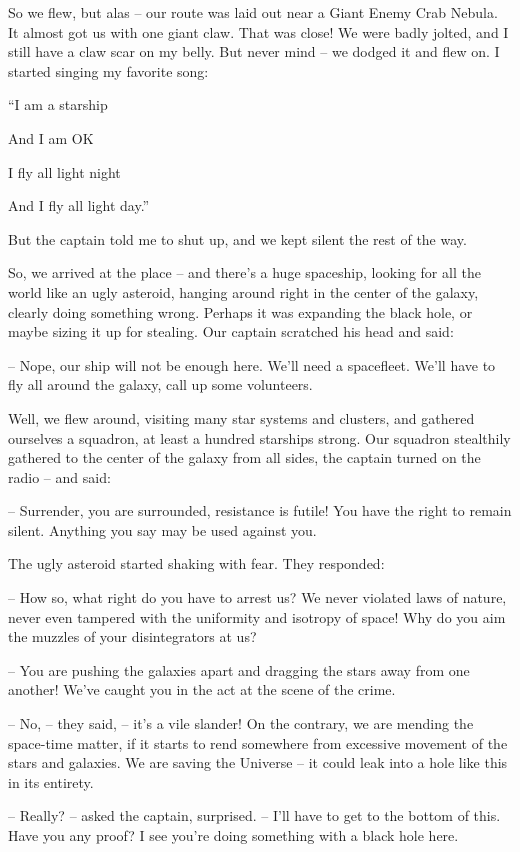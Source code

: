 \documentclass[ebook,oneside,final,openright]{memoir}
\begin{document}
So we flew, but alas – our route was laid out near a Giant Enemy Crab Nebula. It almost got us with one giant claw. That was close! We were badly jolted, and I still have a claw scar on my belly. But never mind – we dodged it and flew on. I started singing my favorite song: \par
“I am a starship \par
 And I am OK \par
 I fly all light night \par
 And I fly all light day.”\par
 But the captain told me to shut up, and we kept silent the rest of the way.\par
\par
So, we arrived at the place – and there’s a huge spaceship, looking for all the world like an ugly asteroid, hanging around right in the center of the galaxy, clearly doing something wrong. Perhaps it was expanding the black hole, or maybe sizing it up for stealing. Our captain scratched his head and said:\par
– Nope, our ship will not be enough here. We’ll need a spacefleet. We’ll have to fly all around the galaxy, call up some volunteers.\par
Well, we flew around, visiting many star systems and clusters, and gathered ourselves a squadron, at least a hundred starships strong. Our squadron stealthily gathered to the center of the galaxy from all sides, the captain turned on the radio – and said:\par
– Surrender, you are surrounded, resistance is futile! You have the right to remain silent. Anything you say may be used against you.\par
The ugly asteroid started shaking with fear. They responded:\par
– How so, what right do you have to arrest us? We never violated laws of nature, never even tampered with the uniformity and isotropy of space! Why do you aim the muzzles of your disintegrators at us?\par
– You are pushing the galaxies apart and dragging the stars away from one another! We’ve caught you in the act at the scene of the crime.\par
– No, – they said, – it’s a vile slander! On the contrary, we are mending the space-time matter, if it starts to rend somewhere from excessive movement of the stars and galaxies. We are saving the Universe – it could leak into a hole like this in its entirety.\par
– Really? – asked the captain, surprised. – I’ll have to get to the bottom of this. Have you any proof? I see you’re doing something with a black hole here.\par
\end{document}
